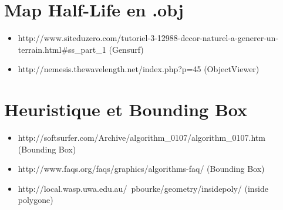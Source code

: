 \documentclass[a4paper,12pt]{report}
\begin{document}
\section*{Map Half-Life en .obj}
\begin{itemize}
 \item http://www.siteduzero.com/tutoriel-3-12988-decor-naturel-a-generer-un-terrain.html\#ss\_part\_1  (Gensurf)
 
 \item http://nemesis.thewavelength.net/index.php?p=45  (ObjectViewer)
\end{itemize}

 

\section*{Heuristique et Bounding Box}
\begin{itemize}
 \item http://softsurfer.com/Archive/algorithm\_0107/algorithm\_0107.htm  (Bounding Box)
 
 \item http://www.faqs.org/faqs/graphics/algorithms-faq/  (Bounding Box)
 
 \item http://local.wasp.uwa.edu.au/~pbourke/geometry/insidepoly/  (inside polygone)
\end{itemize} 
\end{document}
